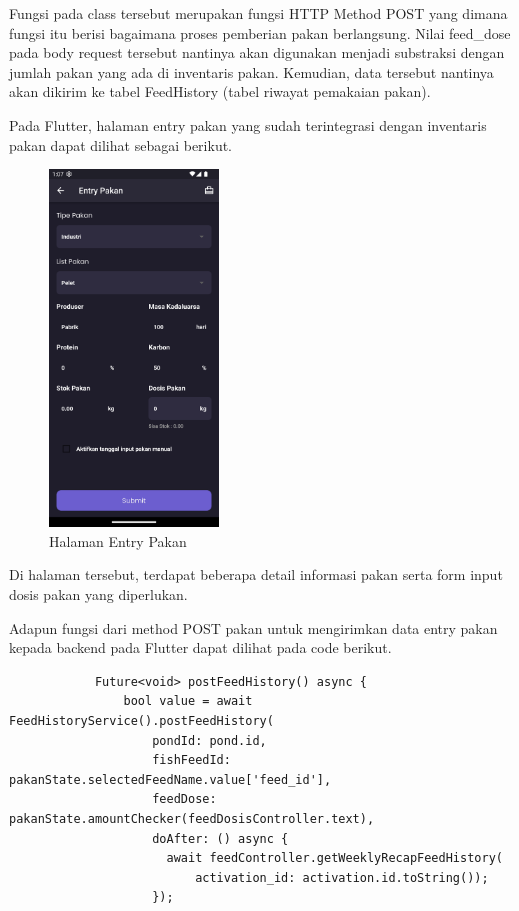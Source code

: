 \begin{spacing}{1.5}
\begin{enumerate}
		Fungsi pada class tersebut merupakan fungsi HTTP Method POST yang dimana fungsi itu berisi bagaimana proses pemberian pakan berlangsung. Nilai feed\_dose pada body request tersebut nantinya akan digunakan menjadi substraksi dengan jumlah pakan yang ada di inventaris pakan. Kemudian, data tersebut nantinya akan dikirim ke tabel FeedHistory (tabel riwayat pemakaian pakan).

		Pada Flutter, halaman entry pakan yang sudah terintegrasi dengan inventaris pakan dapat dilihat sebagai berikut.

		\begin{figure}[H]
			\centering
			\includegraphics[width=0.4\textwidth]{gambar/sprint4/entry_2.png}
			\caption{Halaman Entry Pakan}
		\end{figure}


		Di halaman tersebut, terdapat beberapa detail informasi pakan serta form input dosis pakan yang diperlukan.
		
		Adapun fungsi dari method POST pakan untuk mengirimkan data entry pakan kepada backend pada Flutter dapat dilihat pada code berikut.

		\begin{lstlisting}
			Future<void> postFeedHistory() async {
				bool value = await FeedHistoryService().postFeedHistory(
					pondId: pond.id,
					fishFeedId: pakanState.selectedFeedName.value['feed_id'],
					feedDose: pakanState.amountChecker(feedDosisController.text),
					doAfter: () async {
					  await feedController.getWeeklyRecapFeedHistory(
						  activation_id: activation.id.toString());
					});
			

\end{lstlisting}
\end{enumerate}
\end{spacing}
